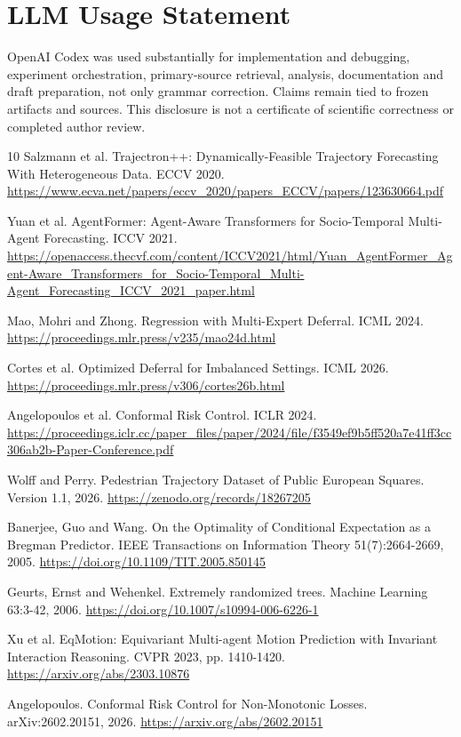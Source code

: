 \documentclass[10pt,twocolumn,letterpaper]{article}
\begin{document}
\clearpage
{}
\section*{LLM Usage Statement}
OpenAI Codex was used substantially for implementation and debugging,
experiment orchestration, primary-source retrieval, analysis, documentation
and draft preparation, not only grammar correction. Claims remain tied to
frozen artifacts and sources. This disclosure is not a certificate of scientific
correctness or completed author review.

\begin{thebibliography}{10}
 Salzmann et al. Trajectron++: Dynamically-Feasible Trajectory Forecasting With Heterogeneous Data. ECCV 2020. \url{https://www.ecva.net/papers/eccv_2020/papers_ECCV/papers/123630664.pdf}

 Yuan et al. AgentFormer: Agent-Aware Transformers for Socio-Temporal Multi-Agent Forecasting. ICCV 2021. \url{https://openaccess.thecvf.com/content/ICCV2021/html/Yuan_AgentFormer_Agent-Aware_Transformers_for_Socio-Temporal_Multi-Agent_Forecasting_ICCV_2021_paper.html}

 Mao, Mohri and Zhong. Regression with Multi-Expert Deferral. ICML 2024. \url{https://proceedings.mlr.press/v235/mao24d.html}

 Cortes et al. Optimized Deferral for Imbalanced Settings. ICML 2026. \url{https://proceedings.mlr.press/v306/cortes26b.html}

 Angelopoulos et al. Conformal Risk Control. ICLR 2024. \url{https://proceedings.iclr.cc/paper_files/paper/2024/file/f3549ef9b5ff520a7e41ff3cc306ab2b-Paper-Conference.pdf}

 Wolff and Perry. Pedestrian Trajectory Dataset of Public European Squares. Version 1.1, 2026. \url{https://zenodo.org/records/18267205}

 Banerjee, Guo and Wang. On the Optimality of Conditional Expectation as a Bregman Predictor. IEEE Transactions on Information Theory 51(7):2664-2669, 2005. \url{https://doi.org/10.1109/TIT.2005.850145}

 Geurts, Ernst and Wehenkel. Extremely randomized trees. Machine Learning 63:3-42, 2006. \url{https://doi.org/10.1007/s10994-006-6226-1}

 Xu et al. EqMotion: Equivariant Multi-agent Motion Prediction with Invariant Interaction Reasoning. CVPR 2023, pp. 1410-1420. \url{https://arxiv.org/abs/2303.10876}

 Angelopoulos. Conformal Risk Control for Non-Monotonic Losses. arXiv:2602.20151, 2026. \url{https://arxiv.org/abs/2602.20151}

\end{thebibliography}
\end{document}
